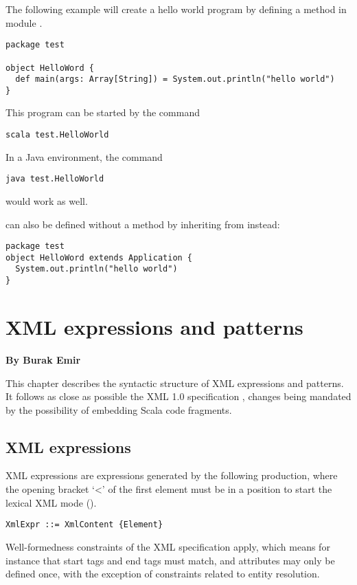\example The following example will create a hello world program by defining
a method  in module .
\begin{lstlisting}
package test 

object HelloWord {
  def main(args: Array[String]) = System.out.println("hello world")
}
\end{lstlisting}

This program can be started by the command
\begin{lstlisting}
scala test.HelloWorld
\end{lstlisting}
In a Java environment, the command
\begin{lstlisting}
java test.HelloWorld
\end{lstlisting}
would work as well. 

 can also be defined without a  method 
by inheriting from  instead:
\begin{lstlisting}
package test 
object HelloWord extends Application {
  System.out.println("hello world")
}
\end{lstlisting}

\chapter{XML expressions and patterns}

{\bf By Burak Emir}\bigskip\bigskip


This chapter describes the syntactic structure of XML expressions and patterns.
It follows as close as possible the XML 1.0 specification \cite{w3c:xml},
changes being mandated by the possibility of embedding Scala code fragments.

\section{XML expressions}
XML expressions are expressions generated by the following production, where the 
opening bracket `<' of the first element must be in a position to start the lexical
XML mode ().

\syntax\begin{lstlisting}
XmlExpr ::= XmlContent {Element}
\end{lstlisting}
Well-formedness constraints of the XML specification apply, which
means for instance that start tags and end tags must match, and
attributes may only be defined once, with the exception of constraints
related to entity resolution.

